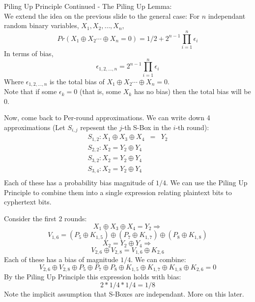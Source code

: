 \documentclass[9pt]{beamer}
\begin{document}
\begin{frame}
Piling Up Principle Continued - The Piling Up Lemma:\\
\vspace{5mm}
We extend the idea on the previous slide to the general case: For $n$ independant random binary variables, $X_1, X_2, \dots, X_n$, 
\[ Pr(X_1 \oplus X_2 \cdots \oplus X_n = 0) = 1/2 + 2^{n-1} \prod_{i=1}^n \epsilon_i \]
In terms of bias,
\[ \epsilon_{1,2,\dots,n} = 2^{n-1} \prod_{i = 1}^n \epsilon_i \]
Where $\epsilon_{1,2,\dots,n}$ is the total bias of $X_1 \oplus X_2 \cdots \oplus X_n = 0$. \\
\vspace{5mm}
Note that if some $\epsilon_k = 0$ (that is, some $X_k$ has no bias) then the total bias will be $0$.  
\end{frame}

\begin{frame}
Now, come back to Per-round approximations. We can write down 4 approximations (Let $S_{i,j}$ repesent the $j$-th S-Box in the $i$-th round):
\begin{eqnarray*}
S_{1,2}: X_1 \oplus X_3 \oplus X_4 & = & Y_2 \\
S_{2,2}: X_2 = Y_2 \oplus Y_4 \\
S_{3,2}: X_2 = Y_2 \oplus Y_4 \\
S_{3,4}: X_2 = Y_2 \oplus Y_4 \\
\end{eqnarray*}
Each of these has a probability bias magnitude of $1/4$. We can use the Piling Up Principle to combine them into a single expression relating plaintext bits to cyphertext bits.
\end{frame}

\begin{frame}
Consider the first 2 rounds:\\
\vspace{5mm}
\[  X_1 \oplus X_3 \oplus X_4 = Y_2 \Rightarrow \]
\[ V_{1,6} = (P_5\oplus K_{1,5}) \oplus (P_7\oplus K_{1,7}) \oplus (P_8\oplus K_{1,8}) \]
\vspace{2mm}
\[ X_2 = Y_2 \oplus Y_4 \Rightarrow \]
\[ V_{2,6} \oplus V_{2,8} = V_{1,6} \oplus K_{2,6} \]
\vspace{2mm}
Each of these has a bias of magnitude $1/4$. We can combine:
\[  V_{2,6} \oplus V_{2,8} \oplus P_5 \oplus P_7 \oplus P_8 \oplus K_{1,5} \oplus K_{1,7} \oplus K_{1,8} \oplus K_{2,6} = 0 \]
By the Piling Up Principle this expression holds with bias:
\[ 2 * 1/4 * 1/4 = 1/8 \]
Note the implicit assumption that S-Boxes are independant. More on this later.
\end{frame}
\end{document}
